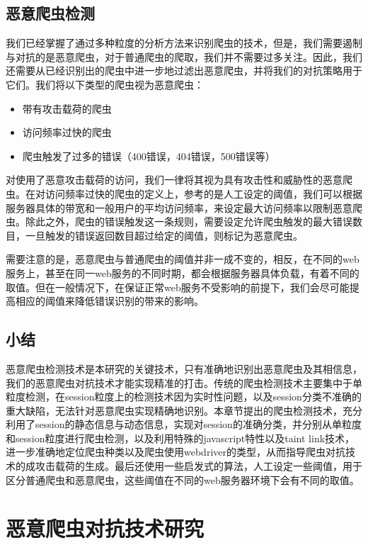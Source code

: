 \documentclass[doctor,privacy,twoside]{buaa_mac}
\begin{document}
\section{恶意爬虫检测}

我们已经掌握了通过多种粒度的分析方法来识别爬虫的技术，但是，我们需要遏制与对抗的是恶意爬虫，对于普通爬虫的爬取，我们并不需要过多关注。因此，我们还需要从已经识别出的爬虫中进一步地过滤出恶意爬虫，并将我们的对抗策略用于它们。我们将以下类型的爬虫视为恶意爬虫：
\begin{itemize}
\item 带有攻击载荷的爬虫
\item 访问频率过快的爬虫
\item 爬虫触发了过多的错误（400错误，404错误，500错误等）
\end{itemize}

对使用了恶意攻击载荷的访问，我们一律将其视为具有攻击性和威胁性的恶意爬虫。在对访问频率过快的爬虫的定义上，参考的是人工设定的阈值，我们可以根据服务器具体的带宽和一般用户的平均访问频率，来设定最大访问频率以限制恶意爬虫。除此之外，爬虫的错误触发这一条规则，需要设定允许爬虫触发的最大错误数目，一旦触发的错误返回数目超过给定的阈值，则标记为恶意爬虫。

需要注意的是，恶意爬虫与普通爬虫的阈值并非一成不变的，相反，在不同的web服务上，甚至在同一web服务的不同时期，都会根据服务器具体负载，有着不同的取值。但在一般情况下，在保证正常web服务不受影响的前提下，我们会尽可能提高相应的阈值来降低错误识别的带来的影响。


\section{小结}
恶意爬虫检测技术是本研究的关键技术，只有准确地识别出恶意爬虫及其相信息，我们的恶意爬虫对抗技术才能实现精准的打击。传统的爬虫检测技术主要集中于单粒度检测，在session粒度上的检测技术因为实时性问题，以及session分类不准确的重大缺陷，无法针对恶意爬虫实现精确地识别。本章节提出的爬虫检测技术，充分利用了session的静态信息与动态信息，实现对session的准确分类，并分别从单粒度和session粒度进行爬虫检测，以及利用特殊的javascript特性以及taint link技术，进一步准确地定位爬虫种类以及爬虫使用webdriver的类型，从而指导爬虫对抗技术的成攻击载荷的生成。最后还使用一些启发式的算法，人工设定一些阈值，用于区分普通爬虫和恶意爬虫，这些阈值在不同的web服务器环境下会有不同的取值。


\chapter{恶意爬虫对抗技术研究}
\end{document}
